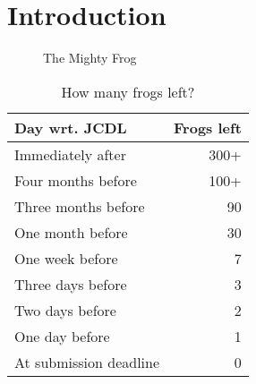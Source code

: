 \chapter{Introduction}
\label{ch:introduction}


\begin{figure}
  \centering
  \caption{The Mighty Frog}
  \label{fig:frog}
\end{figure}

\begin{table}
  \centering
  \caption{How many frogs left?}
  \label{tab:frogsleft}
  \begin{tabular}{ l | r }
    \hline
    \textbf{Day wrt. JCDL} & \textbf{Frogs left} \\
    \hline
    Immediately after      & 300+ \\
    Four months before     & 100+ \\
    Three months before    & 90 \\
    One month before       & 30 \\
    One week before        & 7 \\
    Three days before      & 3 \\
    Two days before        & 2 \\
    One day before         & 1 \\
    At submission deadline & 0 \\
    \hline
  \end{tabular}
\end{table}
